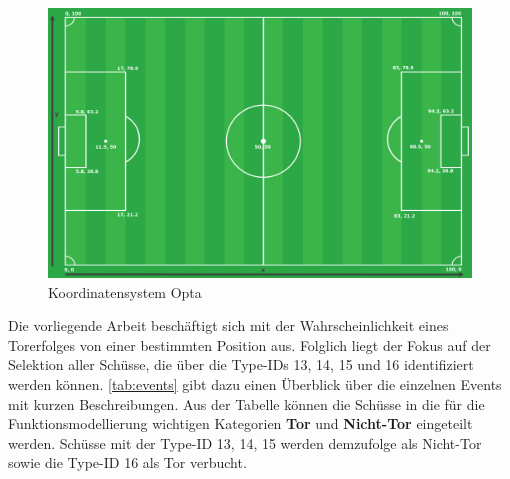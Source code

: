 \begin{figure}[H]
\centering
\includegraphics[scale=0.28]{se-wa-jpg/opta_pitch}
\caption[Koordinatensystem Opta]{Koordinatensystem Opta\protect\footnotemark}
\label{opta_pitch}
\end{figure}
\enlargethispage{2\baselineskip} 
Die vorliegende Arbeit beschäftigt sich mit der Wahrscheinlichkeit eines Torerfolges von einer bestimmten Position aus. Folglich liegt der Fokus auf der Selektion aller Schüsse, die über die Type-IDs \textsf{13, 14, 15} und \textsf{16} identifiziert werden können. \vref{tab:events} gibt dazu einen Überblick über die einzelnen Events mit kurzen Beschreibungen. Aus der Tabelle können die Schüsse in die für die Funktionsmodellierung wichtigen Kategorien \textbf{Tor} und \textbf{Nicht-Tor} eingeteilt werden. Schüsse mit der Type-ID \textsf{13, 14, 15} werden demzufolge als Nicht-Tor sowie die Type-ID \textsf{16} als Tor verbucht.

